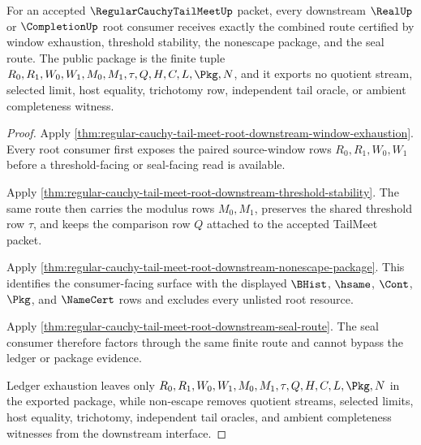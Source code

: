 \begin{theorem}
\label{thm:regular-cauchy-tail-meet-downstream-unblock-package}
For an accepted $\RegularCauchyTailMeetUp$ packet, every downstream $\RealUp$
or $\CompletionUp$ root consumer receives exactly the combined route certified
by window exhaustion, threshold stability, the nonescape package, and the seal
route. The public package is the finite tuple
$R_0,R_1,W_0,W_1,M_0,M_1,\tau,Q,H,C,L,\Pkg,N$, and it exports no quotient
stream, selected limit, host equality, trichotomy row, independent tail oracle,
or ambient completeness witness.
\end{theorem}
\begin{proof}
Apply
\autoref{thm:regular-cauchy-tail-meet-root-downstream-window-exhaustion}. Every
root consumer first exposes the paired source-window rows
$R_0,R_1,W_0,W_1$ before a threshold-facing or seal-facing read is available.

Apply
\autoref{thm:regular-cauchy-tail-meet-root-downstream-threshold-stability}. The
same route then carries the modulus rows $M_0,M_1$, preserves the shared
threshold row $\tau$, and keeps the comparison row $Q$ attached to the accepted
TailMeet packet.

Apply
\autoref{thm:regular-cauchy-tail-meet-root-downstream-nonescape-package}. This
identifies the consumer-facing surface with the displayed $\BHist$, $\hsame$,
$\Cont$, $\Pkg$, and $\NameCert$ rows and excludes every unlisted root resource.

Apply
\autoref{thm:regular-cauchy-tail-meet-root-downstream-seal-route}. The seal
consumer therefore factors through the same finite route and cannot bypass the
ledger or package evidence.

Ledger exhaustion leaves only
$R_0,R_1,W_0,W_1,M_0,M_1,\tau,Q,H,C,L,\Pkg,N$ in the exported package, while
non-escape removes quotient streams, selected limits, host equality, trichotomy,
independent tail oracles, and ambient completeness witnesses from the downstream
interface.
\end{proof}

